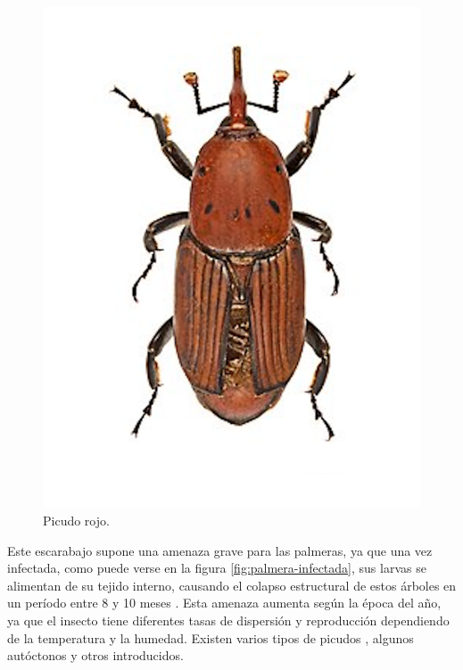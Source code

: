 \begin{figure}[htpb]
  \centering
  \includegraphics[scale=1]{./Figures/picudo-rojo.png}
  \caption{Picudo rojo\protect\footnotemark.}
  \label{fig:picudo-rojo}
\end{figure}


Este escarabajo supone una amenaza grave para las palmeras, ya que una vez infectada, como puede verse en la figura \ref{fig:palmera-infectada}, sus larvas se alimentan de su tejido interno, causando el colapso estructural de estos árboles en un período entre 8 y 10 meses . Esta amenaza aumenta según la época del año, ya que el insecto tiene diferentes tasas de dispersión y reproducción dependiendo de la temperatura y la humedad. Existen varios tipos de picudos , algunos autóctonos y otros introducidos.

